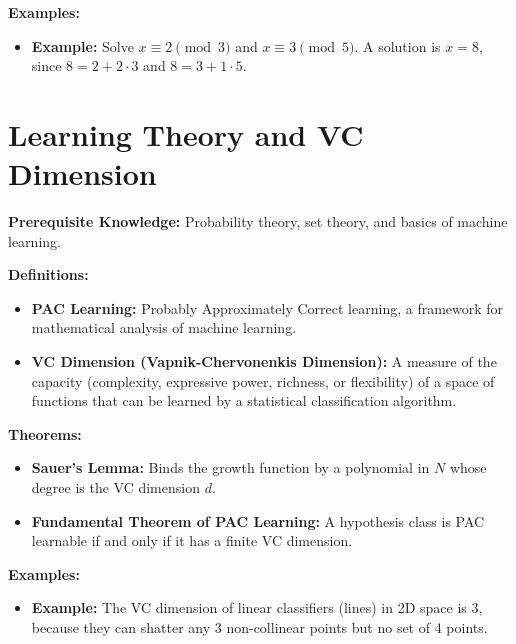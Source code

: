 \textbf{Examples:}
\begin{itemize}
    \item \textbf{Example:} Solve $x \equiv 2 \pmod 3$ and $x \equiv 3 \pmod 5$. A solution is $x = 8$, since $8 = 2+2\cdot3$ and $8 = 3+1\cdot5$.
\end{itemize}


\section{Learning Theory and VC Dimension}
\textbf{Prerequisite Knowledge:} Probability theory, set theory, and basics of machine learning.

\textbf{Definitions:}
\begin{itemize}
    \item \textbf{PAC Learning:} Probably Approximately Correct learning, a framework for mathematical analysis of machine learning.
    \item \textbf{VC Dimension (Vapnik-Chervonenkis Dimension):} A measure of the capacity (complexity, expressive power, richness, or flexibility) of a space of functions that can be learned by a statistical classification algorithm.
\end{itemize}

\textbf{Theorems:}
\begin{itemize}
    \item \textbf{Sauer's Lemma:} Binds the growth function by a polynomial in $N$ whose degree is the VC dimension $d$.
    \item \textbf{Fundamental Theorem of PAC Learning:} A hypothesis class is PAC learnable if and only if it has a finite VC dimension.
\end{itemize}

\textbf{Examples:}
\begin{itemize}
    \item \textbf{Example:} The VC dimension of linear classifiers (lines) in 2D space is 3, because they can shatter any 3 non-collinear points but no set of 4 points.
\end{itemize}
